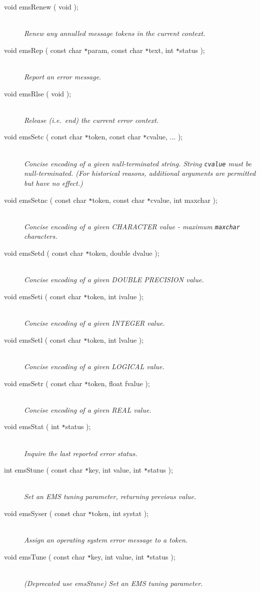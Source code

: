 \documentclass[twoside,11pt]{article}
\renewcommand{\_}{\texttt{\symbol{95}}}
\newcommand{\listline}{\hspace{1pt}\\}
\newcommand{\listline}{}
\begin{document}
\begin {description}
\item[void emsRenew ( void );] \listline
\textit{Renew any annulled message tokens in the current context.}

\item[void emsRep ( const char \texttt{*}param, const char \texttt{*}text, 
int \texttt{*}status );] \listline
\textit{Report an error message.}

\item[void emsRlse ( void );] \listline
\textit{Release (i.e.\ end) the current error context.}

\item[void emsSetc ( const char \texttt{*}token,
const char \texttt{*}cvalue, ... );] \listline
\textit{Concise encoding of a given null-terminated string. String 
\texttt{cvalue} must be null-terminated. (For historical
reasons, additional arguments are permitted but have no effect.)}

\item[void emsSetnc ( const char \texttt{*}token, const char \texttt{*}cvalue,
int maxchar );] \listline
\textit{Concise encoding of a given CHARACTER value - maximum \texttt{maxchar}
characters.}

\item[void emsSetd ( const char \texttt{*}token, double dvalue );] \listline
\textit{Concise encoding of a given DOUBLE PRECISION value.}

\item[void emsSeti ( const char \texttt{*}token, int ivalue );] \listline
\textit{Concise encoding of a given INTEGER value.}

\item[void emsSetl ( const char \texttt{*}token, int lvalue );] \listline
\textit{Concise encoding of a given LOGICAL value.}

\item[void emsSetr ( const char \texttt{*}token, float fvalue );] \listline
\textit{Concise encoding of a given REAL value.}

\item[void emsStat ( int \texttt{*}status );] \listline
\textit{Inquire the last reported error status.}

\item[int emsStune ( const char \texttt{*}key, int value,
int \texttt{*}status );] \listline
\textit{Set an EMS tuning parameter, returning previous value.}

\item[void emsSyser ( const char \texttt{*}token, int systat );] \listline
\textit{Assign an operating system error message to a token.}

\item[void emsTune ( const char \texttt{*}key, int value,
int \texttt{*}status );] \listline
\textit{(Deprecated use emsStune) Set an EMS tuning parameter.}

\end {description}
\end{document}
